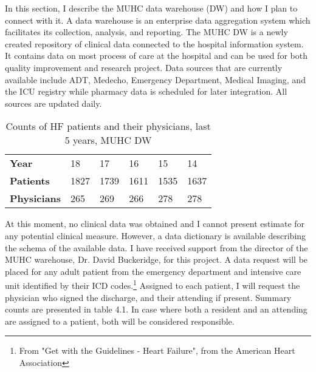 In this section, I describe the MUHC data warehouse (\gls{DW}) and how I plan to connect with it. A data warehouse is an enterprise data aggregation system which facilitates its collection, analysis, and reporting. The MUHC \gls{DW} is a newly created repository of clinical data connected to the hospital information system. It contains data on most process of care at the hospital and can be used for both quality improvement and research project. Data sources that are currently available include ADT, Medecho, Emergency Department, Medical Imaging, and the ICU registry while pharmacy data is scheduled for later integration. All sources are updated daily.


\begin{table}[h!]
\centering
\begin{tabular}{l|lllll}
\textbf{Year}       & 18   & 17   & 16   & 15   & 14   \\
\textbf{Patients}   & 1827 & 1739 & 1611 & 1535 & 1637 \\
\textbf{Physicians} & 265  & 269  & 266  & 278  & 278 
\end{tabular}
\caption{Counts of HF patients and their physicians, last 5 years, MUHC DW}
\end{table}

At this moment, no clinical data was obtained and I cannot present estimate for any potential clinical measure. However, a data dictionary is available describing the schema of the available data. I have received support from the director of the MUHC warehouse, Dr. David Buckeridge, for this project. A data request will be placed for any adult patient from the emergency department and intensive care unit identified by their ICD codes.\footnote{From "Get with the Guidelines - Heart Failure", from the American Heart Association}
Assigned to each patient, I will request the physician who signed the discharge, and their attending if present. Summary counts are presented in table 4.1. In case where both a resident and an attending are assigned to a patient, both will be considered responsible.


